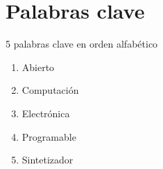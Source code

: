 \documentclass[../proyecto.tex]{subfiles}
\begin{document}
\chapter{Palabras clave}

5 palabras clave en orden alfabético

\begin{enumerate}
    \item Abierto
    \item Computación
    \item Electrónica
    \item Programable
    \item Sintetizador
\end{enumerate}
\end{document}
